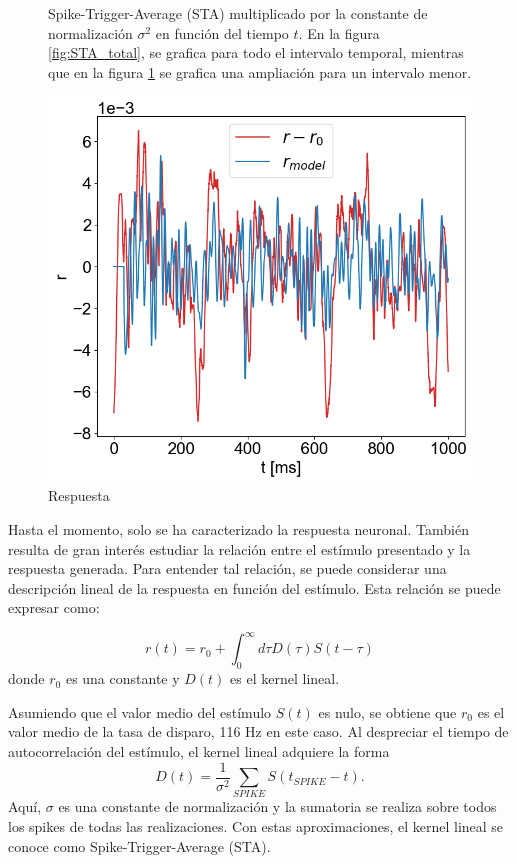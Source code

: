 \documentclass[aps,prb,twocolumn,superscriptaddress,floatfix,longbibliography]{revtex4-2}
\newcounter{para}
\begin{document}
\begin{figure}[h]
\begin{subfigure}[b]{0.3\textwidth}
      \caption{\label{fig:STA_parcial}}
  \end{subfigure}
     \caption{Spike-Trigger-Average (STA) multiplicado por la constante de normalización $\sigma^2$ en función del tiempo $t$. En la figura \ref{fig:STA_total}, se grafica para todo el intervalo temporal, mientras que en la figura \ref{fig:STA_parcial} se grafica una ampliación para un intervalo menor.}
     \label{fig:STA}
\end{figure}

\begin{figure}[h]
  \includegraphics[clip=true,width=0.9\columnwidth]{r_vs_r_model.png}
  \caption{Respuesta}
   \label{fig:r_vs_r_model}
\end{figure}

Hasta el momento, solo se ha caracterizado la respuesta neuronal. También resulta de gran interés estudiar la relación entre el estímulo presentado y la respuesta generada. Para entender tal relación, se puede considerar una descripción lineal de la respuesta en función del estímulo. Esta relación se puede expresar como:

\[r(t) = r_0 + \int_0^\infty d\tau D(\tau) S(t - \tau)\]
donde \( r_0 \) es una constante y \( D(t) \) es el kernel lineal.

Asumiendo que el valor medio del estímulo $S(t)$ es nulo, se obtiene que $r_0$ es el valor medio de la tasa de disparo, 116 Hz en este caso. Al despreciar el tiempo de autocorrelación del estímulo, el kernel lineal adquiere la forma
\[D(t) = \frac{1}{\sigma^2} \sum_{SPIKE} S(t_{SPIKE} - t).\]
Aquí, \( \sigma \) es una constante de normalización y la sumatoria se realiza sobre todos los spikes de todas las realizaciones. Con estas aproximaciones, el kernel lineal se conoce como Spike-Trigger-Average (STA).
\end{document}

